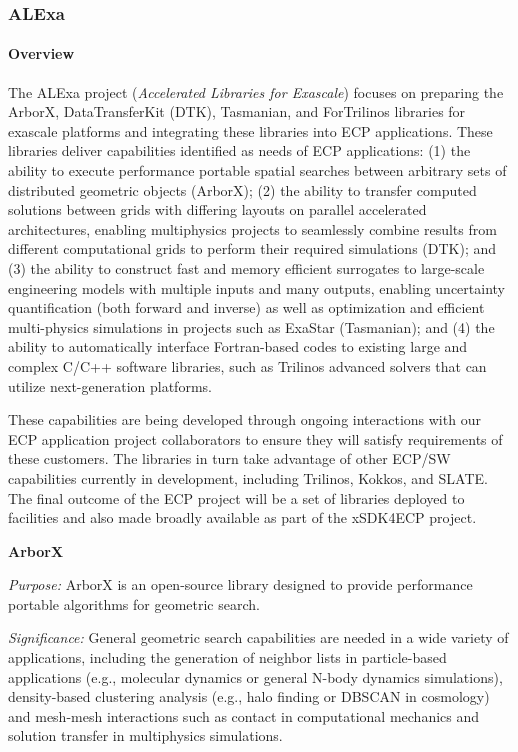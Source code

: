 \subsubsection{ ALExa}


\paragraph{Overview}

The ALExa project ({\sl Accelerated Libraries for Exascale}) focuses on
preparing the ArborX, DataTransferKit (DTK), Tasmanian, and ForTrilinos libraries for exascale
platforms and integrating these libraries into ECP applications.
These libraries deliver capabilities identified as needs of ECP applications:
%
(1) the ability to execute performance portable spatial searches between
arbitrary sets of distributed geometric objects (ArborX);
%
(2) the ability to transfer computed
solutions between grids with differing layouts on parallel accelerated
architectures, enabling multiphysics projects to seamlessly combine results
from different computational grids to perform their required simulations
(DTK); and
%
(3) the ability to construct fast and memory efficient surrogates to
large-scale engineering models with multiple inputs and many outputs,
enabling uncertainty quantification (both forward and inverse) as well as
optimization and efficient multi-physics simulations in projects such as
ExaStar (Tasmanian); and
%
(4) the ability to automatically interface Fortran-based codes to existing
large and complex C/C++ software libraries, such as Trilinos advanced solvers
that can utilize next-generation platforms.


These capabilities are being developed through ongoing interactions with our
ECP application project collaborators to ensure they will satisfy requirements
of these customers.  The libraries in turn take advantage of other ECP/SW
capabilities currently in development, including Trilinos,
Kokkos, and SLATE.  The final outcome of the ECP project will be a set of
libraries deployed to facilities and also made broadly available as part of
the xSDK4ECP project.


{\bf ArborX}

{\it Purpose:} ArborX is an open-source library designed to provide
performance portable algorithms for geometric search.

{\it Significance:} General geometric search capabilities are needed in a wide
variety of applications, including the generation of neighbor lists in
particle-based applications (e.g., molecular dynamics or general N-body
dynamics simulations), density-based clustering analysis (e.g., halo finding
or DBSCAN in cosmology) and mesh-mesh interactions such as contact in
computational mechanics and solution transfer in multiphysics simulations.

